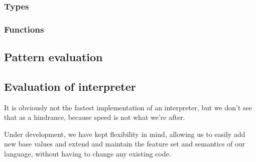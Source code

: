 \subsubsection{Types}

\subsubsection{Functions}



\subsection{Pattern evaluation}

\subsection{Evaluation of interpreter}
It is obviously not the fastest implementation of an interpreter, but we don't see that as a hindrance, because speed is not what we're after.

Under development, we have kept flexibility in mind, allowing us to easily add new base values and extend and maintain the feature set and semantics of our language, without having to change any existing code.
